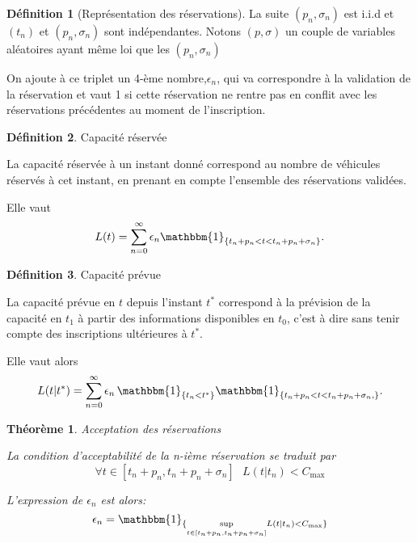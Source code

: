 \documentclass[12pt,a4paper]{article}
\newcommand{\1}[1]{\mathbbm{1}_{\{#1\}} }
\newtheorem{theorem}{Théorème}
\theoremstyle{definition}
\newtheorem{definition}{Définition}
\begin{document}
{\begin{definition}[Représentation des réservations]
La suite $(p_n,\sigma_n)$ est i.i.d et $(t_n)$ et $(p_n,\sigma_n)$ sont indépendantes. Notons $(p,\sigma)$ un couple de variables aléatoires ayant même loi que les  $(p_n,\sigma_n)$

On ajoute à ce triplet un 4-ème nombre,$\epsilon_n$, qui va correspondre à la validation de la réservation et vaut 1 si cette réservation ne rentre pas en conflit avec les réservations précédentes au moment de l'inscription.
\end{definition}

\begin{definition}{Capacité réservée}

La capacité réservée à un instant donné correspond au nombre de véhicules réservés à cet instant, en prenant en compte l'ensemble des réservations validées.

Elle vaut
\begin{equation}
L(t) = \sum_{n=0}^{\infty} \epsilon_n \mathbbm{1}_{\{t_n+p_n<t<t_n+p_n+\sigma_n\}}.
\end{equation}

\end{definition}



\begin{definition}{Capacité prévue}

La capacité prévue en $t$ depuis l'instant $t^{*}$ correspond à la prévision de la capacité en $t_1$ à partir des informations disponibles en $t_0$, c'est à dire sans tenir compte des inscriptions ultérieures à $t^*$.

Elle vaut alors
\begin{equation}
L(t|t^{*}) = \sum_{n=0}^{\infty} \epsilon_n\,\1{t_n<t^*}\mathbbm{1}_{\{t_n+p_n<t<t_n+p_n+\sigma_n,\}}.
\end{equation}

\end{definition}


\begin{theorem}{Acceptation des réservations}

La condition d'acceptabilité de la n-ième réservation se traduit par
\begin{equation}
\forall t \in [t_n+p_n,t_n+p_n+\sigma_n]\,\,\,\, L(t|t_n) < C_{\max}
\end{equation}

L'expression de $\epsilon_n$ est alors:
\begin{equation}
\epsilon_n = \1{\underset{t \in [t_n+p_n,t_n+p_n+\sigma_n]}{\sup} L(t|t_n) < C_{\max}}
\end{equation}
\end{theorem}

}
\end{document}
